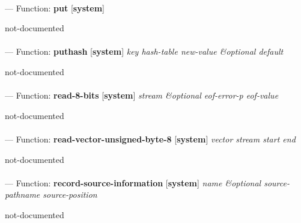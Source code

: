 \paragraph{}
\label{SYSTEM:PUT}
--- Function: \textbf{put} [\textbf{system}] \textit{}

\begin{adjustwidth}{5em}{5em}
not-documented
\end{adjustwidth}

\paragraph{}
\label{SYSTEM:PUTHASH}
--- Function: \textbf{puthash} [\textbf{system}] \textit{key hash-table new-value \&optional default}

\begin{adjustwidth}{5em}{5em}
not-documented
\end{adjustwidth}

\paragraph{}
\label{SYSTEM:READ-8-BITS}
--- Function: \textbf{read-8-bits} [\textbf{system}] \textit{stream \&optional eof-error-p eof-value}

\begin{adjustwidth}{5em}{5em}
not-documented
\end{adjustwidth}

\paragraph{}
\label{SYSTEM:READ-VECTOR-UNSIGNED-BYTE-8}
--- Function: \textbf{read-vector-unsigned-byte-8} [\textbf{system}] \textit{vector stream start end}

\begin{adjustwidth}{5em}{5em}
not-documented
\end{adjustwidth}

\paragraph{}
\label{SYSTEM:RECORD-SOURCE-INFORMATION}
--- Function: \textbf{record-source-information} [\textbf{system}] \textit{name \&optional source-pathname source-position}

\begin{adjustwidth}{5em}{5em}
not-documented
\end{adjustwidth}

